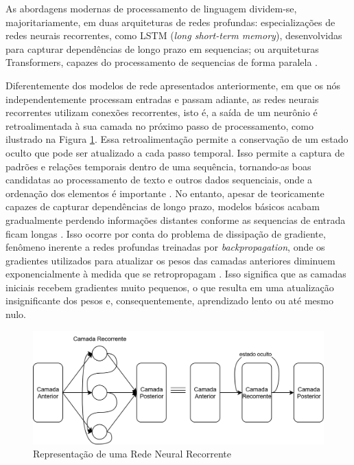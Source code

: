 As abordagens modernas de processamento de linguagem dividem-se, majoritariamente, em duas arquiteturas de redes profundas: especializações de redes neurais recorrentes, como LSTM (\textit{long short-term memory}), desenvolvidas para capturar dependências de longo prazo em sequencias; ou arquiteturas Transformers, capazes do processamento de sequencias de forma paralela \cite{nlp2}.

Diferentemente dos modelos de rede apresentados anteriormente, em que os nós independentemente processam entradas e passam adiante, as redes neurais recorrentes utilizam conexões recorrentes, isto é, a saída de um neurônio é retroalimentada à sua camada no próximo passo de processamento, como ilustrado na Figura \ref{fig:rnn}. Essa retroalimentação permite a conservação de um estado oculto que pode ser atualizado a cada passo temporal. Isso permite a captura de padrões e relações temporais dentro de uma sequência, tornando-as boas candidatas ao processamento de texto e outros dados sequenciais, onde a ordenação dos elementos é importante \cite{rnn}. No entanto, apesar de teoricamente capazes de capturar dependências de longo prazo, modelos básicos acabam gradualmente perdendo informações distantes conforme as sequencias de entrada ficam longas \cite{nlp}. Isso ocorre por conta do problema de dissipação de gradiente, fenômeno inerente a redes profundas treinadas por \textit{backpropagation}, onde os gradientes utilizados para atualizar os pesos das camadas anteriores diminuem exponencialmente à medida que se retropropagam \cite{deeplearningbook}. Isso significa que as camadas iniciais recebem gradientes muito pequenos, o que resulta em uma atualização insignificante dos pesos e, consequentemente, aprendizado lento ou até mesmo nulo.

\begin{figure}[H]
	\caption{\label{fig:rnn}Representação de uma Rede Neural Recorrente}
    \begin{center}
    \includegraphics[width=1\linewidth]{images/rnn.png}
	\end{center}
\end{figure}

